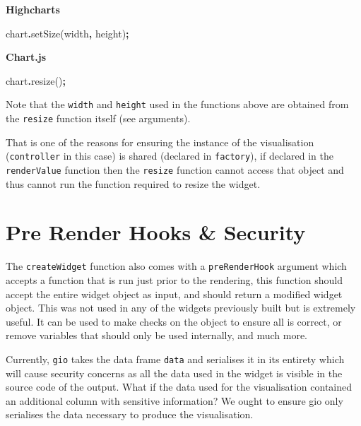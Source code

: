 \documentclass[
]{krantz}
\makeatletter
\newenvironment{Shaded}{\begin{snugshade}}{\end{snugshade}}
\newcommand{\FunctionTok}[1]{\textcolor[rgb]{0,0,0}{#1}}
\newcommand{\NormalTok}[1]{#1}
\newcommand{\OperatorTok}[1]{\textcolor[rgb]{0.43,0.43,0.43}{\textbf{#1}}}
\newenvironment{kframe}{%
\medskip{}
\setlength{\fboxsep}{.8em}
 \def\at@end@of@kframe{}%
 \ifinner\ifhmode%
  \def\at@end@of@kframe{\end{minipage}}%
  \begin{minipage}{\columnwidth}%
 \fi\fi%
 \def\FrameCommand##1{\hskip\@totalleftmargin \hskip-\fboxsep
 \colorbox{shadecolor}{##1}\hskip-\fboxsep
     \hskip-\linewidth \hskip-\@totalleftmargin \hskip\columnwidth}%
 \MakeFramed {\advance\hsize-\width
   \@totalleftmargin\z@ \linewidth\hsize
   \@setminipage}}%
 {\par\unskip\endMakeFramed%
 \at@end@of@kframe}
\renewenvironment{Shaded}{\begin{kframe}}{\end{kframe}}
\makeatother
\begin{document}
\textbf{Highcharts}

\begin{Shaded}
\begin{Highlighting}[]
\NormalTok{chart}\OperatorTok{.}\FunctionTok{setSize}\NormalTok{(width}\OperatorTok{,}\NormalTok{ height)}\OperatorTok{;}
\end{Highlighting}
\end{Shaded}

\textbf{Chart.js}

\begin{Shaded}
\begin{Highlighting}[]
\NormalTok{chart}\OperatorTok{.}\FunctionTok{resize}\NormalTok{()}\OperatorTok{;}
\end{Highlighting}
\end{Shaded}

Note that the \texttt{width} and \texttt{height} used in the functions above are obtained from the \texttt{resize} function itself (see arguments).

That is one of the reasons for ensuring the instance of the visualisation (\texttt{controller} in this case) is shared (declared in \texttt{factory}), if declared in the \texttt{renderValue} function then the \texttt{resize} function cannot access that object and thus cannot run the function required to resize the widget.

\hypertarget{widgets-adv-prerender}{%
\section{Pre Render Hooks \& Security}\label{widgets-adv-prerender}}

The \texttt{createWidget} function also comes with a \texttt{preRenderHook} argument which accepts a function that is run just prior to the rendering, this function should accept the entire widget object as input, and should return a modified widget object. This was not used in any of the widgets previously built but is extremely useful. It can be used to make checks on the object to ensure all is correct, or remove variables that should only be used internally, and much more.

Currently, \texttt{gio} takes the data frame \texttt{data} and serialises it in its entirety which will cause security concerns as all the data used in the widget is visible in the source code of the output. What if the data used for the visualisation contained an additional column with sensitive information? We ought to ensure gio only serialises the data necessary to produce the visualisation.
\end{document}
